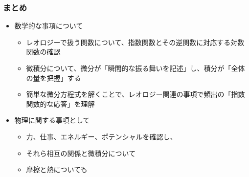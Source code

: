 \documentclass[12pt, dvipdfmx]{beamer}
\newcommand{\backupbegin}{
   \newcounter{framenumberappendix}
   \setcounter{framenumberappendix}{\value{framenumber}}
}
\begin{document}
\begin{frame}
	\frametitle{まとめ}
		\begin{boxnote}
			\begin{itemize}
				\item 数学的な事項について
					\begin{itemize}
						\item レオロジーで扱う関数について、指数関数とその逆関数に対応する対数関数の確認
						\item 微積分について、微分が「瞬間的な振る舞いを記述」し、積分が「全体の量を把握」する
						\item 簡単な微分方程式を解くことで、レオロジー関連の事項で頻出の「指数関数的な応答」を理解
					\end{itemize}
				\item 物理に関する事項として
					\begin{itemize}
						\item 力、仕事、エネルギー、ポテンシャルを確認し、
						\item それら相互の関係と微積分について
						\item 摩擦と熱についても
					\end{itemize}
			\end{itemize}
		\end{boxnote}
\end{frame}

\end{document}
